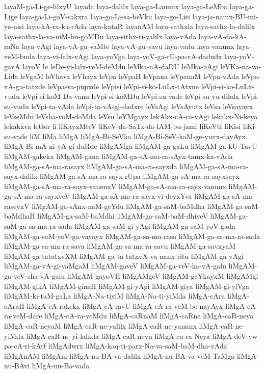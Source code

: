 {layaM-ga-Li-ge-lilxyU
layada
laya-dalilx
laya-ga-Lanunx
laya-ga-LeMba
laya-ga-Lige
laya-ga-Li-goV-sakxra
laya-go-Li-sa-beVku
laya-go-Lisi
laya-ja-namx-BU-mi-ye-nisi
laya-kA-ra-ka-rAda
laya-kataR
layanAM
laya-sathxla
laya-sathx-la-dalilx
laya-sathx-la-va-niM-bu-goMDu
laya-sithx-ti-yalilx
laya-vAda
laya-vA-da-kA-raNa
laya-vAgi
laya-vA-gu-vaMte
laya-vA-gu-vavu
laya-vadu
laya-vanunx
laya-veM-buda
laya-vi-lalx-vAgi
laya-yoVga
laya-yoV-ga-rU-pa-vA-dadudx
laya-yoV-gavA
layoV
le
leDe-yi-lalx-veM-deMdu
leMka-nA-daDU
leMka-nAgi
leVKa-na-va-Lida
leVgaM
leVhava
leVhayx
leVpa
leVpaH
leVpana
leVpanaM
leVpa-vAda
leVpa-vA-gu-tatxde
leVpa-va-pupxde
leVpisi
leVpi-si-ko-LuLx-tAtxne
leVpi-si-ko-LuLx-vudu
leVpi-si-koM-Da-vanu
leVpi-si-koMDu
leVpi-su-vade
leVpi-su-vu-dilalx
leVpi-su-vudu
leVpi-ta-vAda
leVpi-ta-vA-gi-dadxre
leVsAgi
leVsAyutx
leVsa
leVsayayx
leVseMdu
leVsha-voM-doMda
leVsu
leYMgayx
lekAkx-cA-ra-vAgi
lekakx-Ni-keya
lekakxva
letter
li
liKayxMteV
liKeV-da-SaTx-da-lAM-bu-jamf
liKeVtf
liKisi
liKi-su-vade
liM
liMa
liMgA
liMgA-Bi-SeVka
liMgA-Bi-SeV-kaM-ge-yuvx-dayAyx
liMgA-Bi-mA-ni-yA-gi-duRde
liMgAMga
liMgAM-ga-gaLu
liMgAM-ga-kU-TavU
liMgAM-gakekx
liMgAM-gana
liMgAM-ga-sA-ma-ra-sAyx-tamx-ka-vAda
liMgAM-ga-sA-ma-rasayx
liMgAM-ga-sA-ma-ra-sayxda
liMgAM-ga-sA-ma-ra-sayx-dalilx
liMgAM-ga-sA-ma-ra-sayx-rUpa
liMgAM-ga-sA-ma-ra-sayxsayx
liMgAM-ga-sA-ma-ra-sayx-vanenxV
liMgAM-ga-sA-ma-ra-sayx-vanunx
liMgAM-ga-sA-ma-ra-sayxveV
liMgAM-ga-sA-ma-ra-sayx-vi-deyxYva
liMgAM-ga-sA-ma-raseyxV
liMgAM-ga-sAnx-naM-geYdu
liMgAM-ga-saM-baMdha
liMgAM-ga-saM-baMdhaH
liMgAM-ga-saM-baMdhi
liMgAM-ga-saM-baM-dhiyeV
liMgAM-ga-saM-ga-sa-ma-ra-sada
liMgAM-ga-saM-gi-yAgi
liMgAM-ga-saM-yoV-gada
liMgAM-ga-saM-yoV-ga-vayayx
liMgAM-ga-sa-ma-rasa
liMgAM-ga-sa-ma-ra-sada
liMgAM-ga-sa-ma-ra-sava
liMgAM-ga-sa-ma-ra-savu
liMgAM-ga-savxyaM
liMgAM-ga-tatatxvXM
liMgAM-ga-ta-tatxvX-va-nanx-ritu
liMgAM-ga-vAgi
liMgAM-ga-vA-gi-yaMgaM
liMgAM-gaveV
liMgAM-ga-veV-ka-vA-galu
liMgAM-ga-veV-sha-vA-galu
liMgAM-gayoVH
liMgAMgeV
liMgAM-geYkayxM
liMgAMgi
liMgAM-gikA
liMgAM-ginaH
liMgAM-gi-yAgi
liMgAM-giya
liMgAM-gi-yiVga
liMgAM-ki-taM-gaLa
liMgA-Na-tiyiM
liMgA-Na-ti-yiMda
liMgA-cAra
liMgA-cAraH
liMgA-cA-rakekx
liMgA-cA-ravU
liMgA-cA-ra-veM-be-nayAyx
liMgA-cA-ra-veM-dare
liMgA-cA-ra-veMdu
liMgA-caRnaM
liMgA-caRne
liMgA-caR-neya
liMgA-caR-neyaM
liMgA-caR-ne-yalilx
liMgA-caR-ne-yanunx
liMgA-caR-ne-yiMda
liMgA-caR-ne-yi-lalxda
liMgA-caR-neyu
liMgA-ca-ra-Neya
liMgA-deV-vw-pa-cA-ri-kAtf
liMgAdwrx
liMgA-kaq-ti-parx-Na-va-saM-baM-dha-vAda
liMgAnAM
liMgAni
liMgA-nu-BA-va-dalilx
liMgA-nu-BA-va-veM-TaMga
liMgA-nu-BAvi
liMgA-nu-Ba-vada
}
